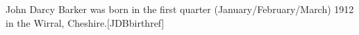 John Darcy Barker was born in the first quarter (January/February/March) 1912 in the Wirral, Cheshire.[JDBbirthref]



